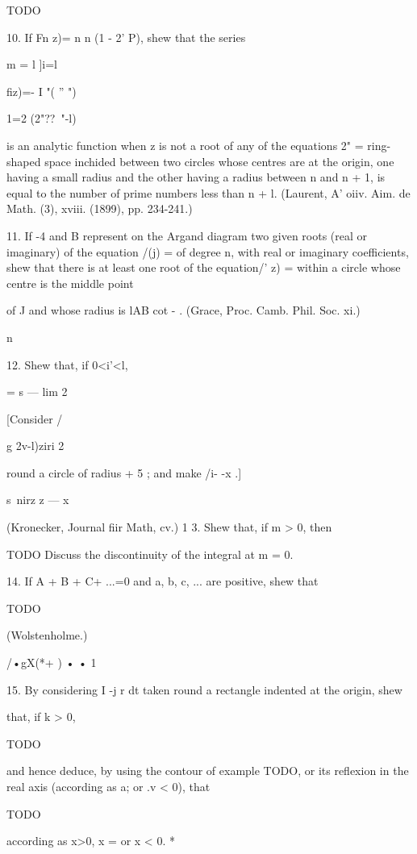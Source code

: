 TODO

%
%

10. If Fn z)= n n (1 - 2' P), shew that the series

m = l ]i=l

fiz)=- I "( '' ")

1=2 (2"??~"-l)%

is an analytic function when z is not a root of any of the equations
2" = %
ring-shaped space inchided between two circles whose centres are at
the origin, one having a small radius and the other having a radius
between n and n + 1, is equal to the number of prime numbers less than
n + l. (Laurent, A' oiiv. Aim. de Math. (3), xviii. (1899), pp.
234-241.)

11. If -4 and B represent on the Argand diagram two given roots (real
or imaginary) of the equation /(j) = of degree n, with real or
imaginary coefficients, shew that there is at least one root of the
equation/' z) = within a circle whose centre is the middle point

of J and whose radius is lAB cot - . (Grace, Proc. Camb. Phil. Soc.
xi.)

n

12. Shew that, if 0<i'<l,

= s — lim 2

[Consider /

g 2v-l)ziri 2

round a circle of radius + 5 ; and make /i- -x .]

s\ nirz z — x

(Kronecker, Journal fiir Math, cv.) 1 3. Shew that, if m > 0, then

TODO
Discuss the discontinuity of the integral at m = 0.

14. If A + B + C+ ...=0 and a, b, c, ... are positive, shew that

TODO

(Wolstenholme.)

/•gX(*+ ) • • 1

15. By considering I -j r dt taken round a rectangle indented at the
origin, shew

that, if k > 0,

TODO

and hence deduce, by using the contour of  example TODO, or its
reflexion in the real axis (according as a; or .v < 0), that

TODO

according as x>0, x = or x < 0. *

